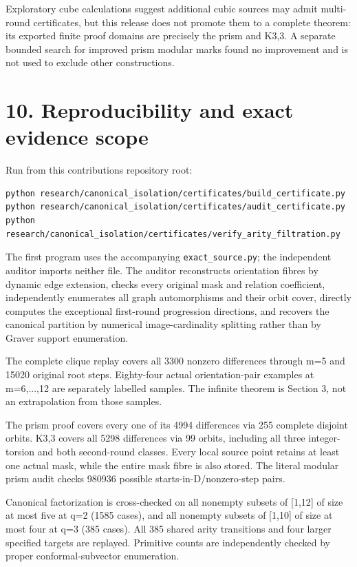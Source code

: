 Exploratory cube calculations suggest additional cubic sources may admit multi-round certificates, but this release does not promote them to a complete theorem: its exported finite proof domains are precisely the prism and K3,3. A separate bounded search for improved prism modular marks found no improvement and is not used to exclude other constructions.

\section{10. Reproducibility and exact evidence scope}\label{n18-reproducibility-and-exact-evidence-scope}

Run from this contribution\textquotesingle s repository root:

\begin{Verbatim}[breaklines=true,breakanywhere=true,fontsize=\footnotesize]
python research/canonical_isolation/certificates/build_certificate.py
python research/canonical_isolation/certificates/audit_certificate.py
python research/canonical_isolation/certificates/verify_arity_filtration.py
\end{Verbatim}

The first program uses the accompanying \texttt{exact\_source.py}; the independent auditor imports neither file. The auditor reconstructs orientation fibres by dynamic edge extension, checks every original mask and relation coefficient, independently enumerates all graph automorphisms and their orbit cover, directly computes the exceptional first-round progression directions, and recovers the canonical partition by numerical image-cardinality splitting rather than by Graver support enumeration.

The complete clique replay covers all 3300 nonzero differences through m=5 and 15020 original root steps. Eighty-four actual orientation-pair examples at m=6,...,12 are separately labelled samples. The infinite theorem is Section 3, not an extrapolation from those samples.

The prism proof covers every one of its 4994 differences via 255 complete disjoint orbits. K3,3 covers all 5298 differences via 99 orbits, including all three integer-torsion and both second-round classes. Every local source point retains at least one actual mask, while the entire mask fibre is also stored. The literal modular prism audit checks 980936 possible starts-in-D/nonzero-step pairs.

Canonical factorization is cross-checked on all nonempty subsets of {[}1,12{]} of size at most five at q=2 (1585 cases), and all nonempty subsets of {[}1,10{]} of size at most four at q=3 (385 cases). All 385 shared arity transitions and four larger specified targets are replayed. Primitive counts are independently checked by proper conformal-subvector enumeration.

